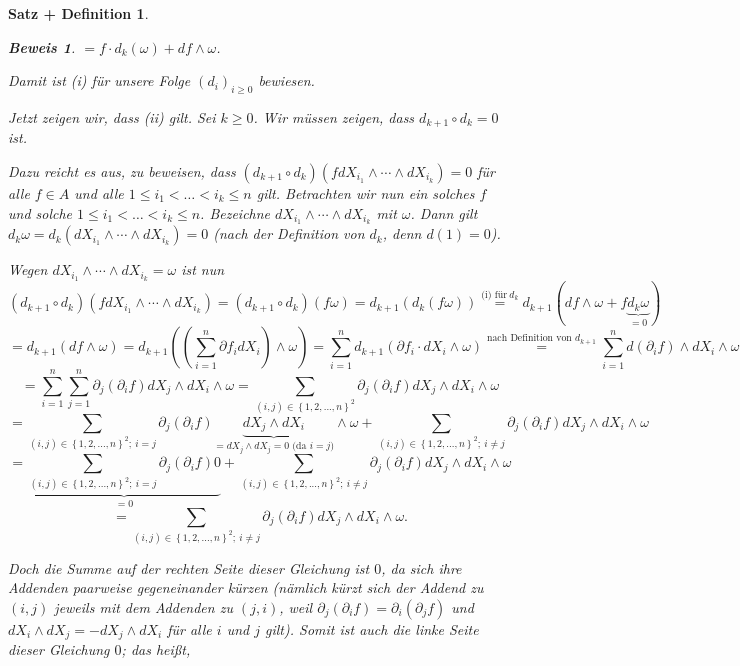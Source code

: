 \documentclass[a4paper,12pt]{scrbook}
\theoremstyle{break}
\newtheorem{SatzDef}[Satz]{Satz + Definition}
\theoremstyle{nonumberbreak}
\newtheorem{Bew}{Beweis}
\theoremstyle{nonumberplain}
\begin{document}
\begin{SatzDef}
\begin{Bew}
$= f \cdot d_k(\omega) + df \wedge \omega$.

Damit ist (i) für unsere Folge $\left(d_i\right)_{i\geq 0}$ bewiesen.

Jetzt zeigen wir, dass (ii) gilt. Sei $k\geq 0$. Wir müssen zeigen, dass $d_{k+1}\circ d_k=0$ ist.

Dazu reicht es aus, zu beweisen, dass $\left(d_{k+1}\circ d_k\right)\left(fdX_{i_1}\wedge \cdots \wedge dX_{i_k}\right) = 0$ für alle $f\in A$ und alle $1\leq i_1<\dots<i_k\leq n$ gilt. Betrachten wir nun ein solches $f$ und solche $1\leq i_1<\dots<i_k\leq n$. Bezeichne $dX_{i_1}\wedge \cdots \wedge dX_{i_k}$ mit $\omega$. Dann gilt $d_k\omega = d_k (dX_{i_1}\wedge \cdots \wedge dX_{i_k}) = 0$ (nach der Definition von $d_k$, denn $d\left(1\right) = 0$).

Wegen $dX_{i_1}\wedge \cdots \wedge dX_{i_k} = \omega$ ist nun
\[
\left(d_{k+1}\circ d_k\right)\left(fdX_{i_1}\wedge \cdots \wedge dX_{i_k}\right) 
=\left(d_{k+1}\circ d_k\right)\left(f\omega\right) = d_{k+1}\left(d_k\left(f\omega\right)\right)
\stackrel{\textrm{(i)\ für}\ d_k}{=}d_{k+1}(df\wedge \omega +f\underbrace{d_k\omega}_{=0})
\]
\[
=d_{k+1}(df\wedge \omega) 
=d_{k+1}\left(\left(\sum_{i=1}^{n}\partial f_i dX_i\right)\wedge \omega\right)
=\sum_{i=1}^{n} d_{k+1}\left(\partial f_i \cdot dX_i\wedge \omega\right)
\stackrel{\text{nach Definition von }d_{k+1}}{=}\sum_{i=1}^{n}d(\partial_i f) \wedge dX_i\wedge \omega
\]
\[
=\sum_{i=1}^n \sum_{j=1}^n \partial_j (\partial_i f)dX_j\wedge dX_{i}\wedge \omega
= \sum_{\left(i,j\right)\in\left\{1,2,...,n\right\}^2} \partial_j (\partial_i f) dX_j \wedge dX_i \wedge \omega
\]
\[
= \sum_{\left(i,j\right)\in\left\{1,2,...,n\right\}^2;\ i=j} \partial_j (\partial_i f) \underbrace{dX_j \wedge dX_i}_{= dX_j\wedge dX_j = 0\text{ (da }i=j\text{)}} \wedge \omega + \sum_{\left(i,j\right)\in\left\{1,2,...,n\right\}^2;\ i\neq j} \partial_j (\partial_i f) dX_j \wedge dX_i \wedge \omega
\]
\[
= \underbrace{\sum_{\left(i,j\right)\in\left\{1,2,...,n\right\}^2;\ i=j} \partial_j (\partial_i f) 0}_{=0} + \sum_{\left(i,j\right)\in\left\{1,2,...,n\right\}^2;\ i\neq j} \partial_j (\partial_i f) dX_j \wedge dX_i \wedge \omega  
\]
\[
= \sum_{\left(i,j\right)\in\left\{1,2,...,n\right\}^2;\ i\neq j} \partial_j (\partial_i f) dX_j \wedge dX_i \wedge \omega  .
\]

Doch die Summe auf der rechten Seite dieser Gleichung ist $0$, da sich ihre Addenden paarweise gegeneinander kürzen (nämlich kürzt sich der Addend zu $\left(i,j\right)$ jeweils mit dem Addenden zu $\left(j,i\right)$, weil $\partial_j(\partial_i f) = \partial_i(\partial_j f)$ und $dX_i\wedge dX_j=-dX_j\wedge dX_i$ für alle $i$ und $j$ gilt). Somit ist auch die linke Seite dieser Gleichung $0$; das heißt,


\end{Bew}
\end{SatzDef}
\end{document}
